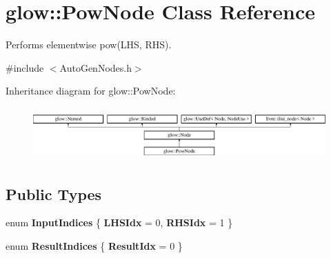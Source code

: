 \hypertarget{classglow_1_1_pow_node}{}\section{glow\+:\+:Pow\+Node Class Reference}
\label{classglow_1_1_pow_node}


Performs elementwise pow(\+L\+H\+S, R\+H\+S).  




{\ttfamily \#include $<$Auto\+Gen\+Nodes.\+h$>$}

Inheritance diagram for glow\+:\+:Pow\+Node\+:\begin{figure}[H]
\begin{center}
\leavevmode
\includegraphics[height=2.028986cm]{classglow_1_1_pow_node}
\end{center}
\end{figure}
\subsection*{Public Types}
\begin{DoxyCompactItemize}
\item 
\mbox{\label{classglow_1_1_pow_node_af2b3af9c5c20cf1d1b7c4fcccdd382de}} 
enum {\bfseries Input\+Indices} \{ {\bfseries L\+H\+S\+Idx} = 0, 
{\bfseries R\+H\+S\+Idx} = 1
 \}
\item 
\mbox{\label{classglow_1_1_pow_node_a7f264eeeeb68bc84c46a75067167cab4}} 
enum {\bfseries Result\+Indices} \{ {\bfseries Result\+Idx} = 0
 \}
\end{DoxyCompactItemize}
